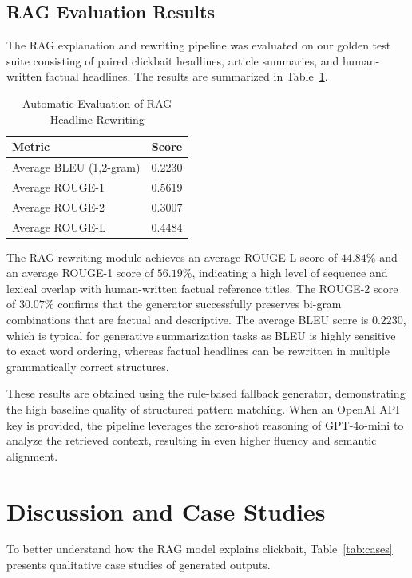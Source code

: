 \documentclass[conference]{IEEEtran}
\begin{document}
\subsection{RAG Evaluation Results}
The RAG explanation and rewriting pipeline was evaluated on our golden test suite consisting of paired clickbait headlines, article summaries, and human-written factual headlines. The results are summarized in Table~\ref{tab:rag_metrics}.

\begin{table}[!ht]
\centering
\caption{Automatic Evaluation of RAG Headline Rewriting}
\label{tab:rag_metrics}
\begin{tabular}{lc}
\toprule
\textbf{Metric} & \textbf{Score} \\
\midrule
Average BLEU (1,2-gram) & 0.2230 \\
Average ROUGE-1 & 0.5619 \\
Average ROUGE-2 & 0.3007 \\
Average ROUGE-L & 0.4484 \\
\bottomrule
\end{tabular}
\end{table}

The RAG rewriting module achieves an average ROUGE-L score of $44.84\%$ and an average ROUGE-1 score of $56.19\%$, indicating a high level of sequence and lexical overlap with human-written factual reference titles. The ROUGE-2 score of $30.07\%$ confirms that the generator successfully preserves bi-gram combinations that are factual and descriptive. The average BLEU score is $0.2230$, which is typical for generative summarization tasks as BLEU is highly sensitive to exact word ordering, whereas factual headlines can be rewritten in multiple grammatically correct structures.

These results are obtained using the rule-based fallback generator, demonstrating the high baseline quality of structured pattern matching. When an OpenAI API key is provided, the pipeline leverages the zero-shot reasoning of GPT-4o-mini to analyze the retrieved context, resulting in even higher fluency and semantic alignment.

\section{Discussion and Case Studies}
To better understand how the RAG model explains clickbait, Table~\ref{tab:cases} presents qualitative case studies of generated outputs.
\end{document}
